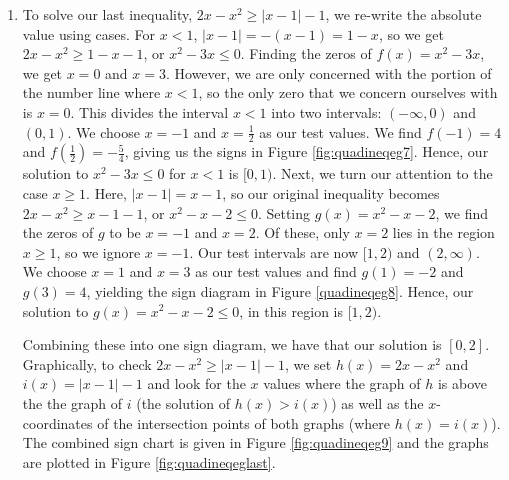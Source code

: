 {\begin{enumerate}
In this case, we say the line $y=2x$ is \textbf{tangent} to $y=x^2+1$ at $\left(1, 2\right)$.  Finding tangent lines to arbitrary functions is a fundamental problem solved, in general, with Calculus.






\item  To solve our last inequality,  $2x-x^2 \geq |x-1|-1$, we re-write the absolute value using cases.  For $x < 1$, $|x-1| = -(x-1) = 1-x$, so we get $2x-x^2 \geq 1-x-1$, or $x^2-3x \leq 0$.  Finding the zeros of $f(x) = x^2-3x$, we get $x=0$ and $x=3$.  However, we are only concerned with the portion of the number line where $x < 1$, so the only zero that we concern ourselves with is $x=0$.  This divides the interval $x<1$ into two intervals:  $(-\infty, 0)$ and $(0,1)$.  We choose $x=-1$ and $x=\frac{1}{2}$ as our test values.  We find $f(-1) = 4$ and $f\left(\frac{1}{2}\right) = -\frac{5}{4}$, giving us the signs in Figure \ref{fig:quadineqeg7}. Hence, our solution to $x^2-3x \leq 0$ for $x < 1$ is $[0,1)$.  Next, we turn our attention to the case $x \geq 1$.  Here, $|x-1| = x-1$, so our original inequality becomes $2x-x^2 \geq x-1-1$, or $x^2-x-2 \leq 0$.  Setting $g(x) = x^2-x-2$, we find the zeros of $g$ to be $x=-1$ and $x=2$.  Of these, only $x=2$ lies in the region $x \geq 1$, so we ignore $x=-1$.  Our test intervals are now $[1,2)$ and $(2,\infty)$.  We choose $x=1$ and $x=3$ as our test values and find $g(1) = -2$ and $g(3) = 4$, yielding the sign diagram in Figure \ref{quadineqeg8}.  Hence, our solution to $g(x) = x^2-x-2 \leq 0$, in this region is $[1,2)$.




Combining these into one sign diagram, we have that our solution is $[0,2]$.  Graphically, to check $2x-x^2 \geq |x-1|-1$, we set $h(x) = 2x-x^2$ and $i(x) = |x-1|-1$ and look for the $x$ values where the graph of $h$ is above the the graph of $i$ (the solution of $h(x) > i(x)$) as well as the $x$-coordinates of the intersection points of both graphs (where $h(x)=i(x)$).  The combined sign chart is given in Figure \ref{fig:quadineqeg9} and the graphs are plotted in Figure \ref{fig:quadineqeglast}.

\end{enumerate}
}

